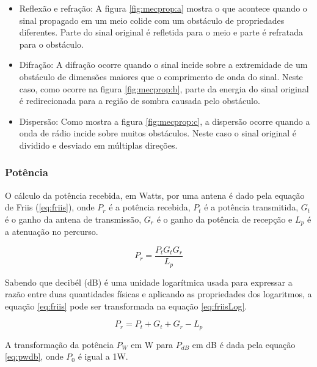 \documentclass[tc,twoside]{iiufrgs}
\begin{document}
\begin{itemize}
\item Reflexão e refração: 
A figura \ref{fig:mecprop:a} mostra o que acontece quando o sinal propagado em um meio colide com um obstáculo de propriedades diferentes. Parte do sinal original é refletida para o meio e parte é refratada para o obstáculo. \cite{rappaport2009comunicacoes} %
\item Difração:
A difração ocorre quando o sinal incide sobre a extremidade de um obstáculo de dimensões maiores que o comprimento de onda do sinal. Neste caso, como ocorre na figura \ref{fig:mecprop:b}, parte da energia do sinal original é redirecionada para a região de sombra causada pelo obstáculo. \cite{rappaport2009comunicacoes} %
\item Dispersão: 
Como mostra a figura \ref{fig:mecprop:c}, a dispersão ocorre quando a onda de rádio incide sobre muitos obstáculos. Neste caso o sinal original é dividido e desviado em múltiplas direções. \cite{rappaport2009comunicacoes} %
\end{itemize}

\subsubsection{Potência}

O cálculo da potência recebida, em Watts, por uma antena é dado pela equação de Friis (\ref{eq:friis}), onde ${P}_{r}$ é a potência recebida, ${P}_{t}$ é a potência transmitida, ${G}_{t}$ é o ganho da antena de transmissão, ${G}_{r}$ é o ganho da potência de recepção e ${L}_{p}$ é a atenuação no percurso. \cite{rappaport2009comunicacoes} \cite{haykin2009sistemas}

\begin{equation}
{P}_{r} = \frac{{P}_{t}{G}_{t}{G}_{r}} {{L}_{p}}
\label{eq:friis}
\end{equation}

Sabendo que decibél (dB) é uma unidade logarítmica usada para expressar a razão entre duas quantidades físicas e aplicando as propriedades dos logaritmos, a equação \ref{eq:friis} pode ser transformada na equação \ref{eq:friisLog}. \cite{haykin2009sistemas}

\begin{equation}
{P}_{r} = {P}_{t}+{G}_{t}+{G}_{r}-{L}_{p}
\label{eq:friisLog}
\end{equation}

A transformação da potência $P_W$ em W para $P_{dB}$ em dB é dada pela equação \ref{eq:pwdb}, onde $P_0$ é igual a 1W.
\end{document}
